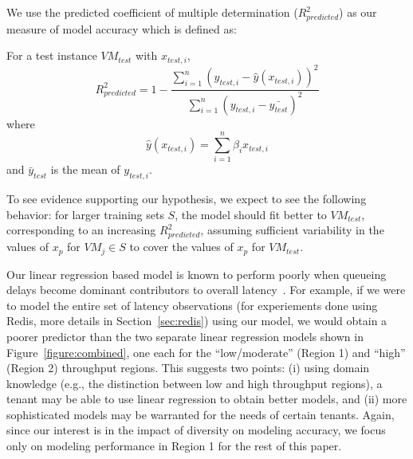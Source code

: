  We use the predicted coefficient of multiple determination ($R^2_{predicted}$) as our measure of model accuracy which is defined as: 
\begin{definition}
For a test instance $VM_{test}$ with $x_{test,i}$,
\begin{displaymath}
R_{predicted}^2=1-\frac{\sum_{i=1}^{n} (y_{test,i} - \hat{y}(x_{test,i}))^{2}}{\sum_{i=1}^{n} (y_{test,i} - \bar{y_{test}})^{2}}
\end{displaymath}
where
\begin{displaymath}
\hat{y}(x_{test,i})=\sum_{i=1}^{n} \beta_i x_{test,i}
\end{displaymath}
and $\bar{y}_{test}$ is the mean of $y_{test,i}$.
\end{definition}


To see evidence supporting our hypothesis, we expect to see the following behavior: for larger training sets $S$, the model should fit better to $VM_{test}$, corresponding to an increasing $R^2_{predicted}$, assuming sufficient variability in the values of $x_p$ for $VM_j\in S$ to cover the values of $x_p$ for $VM_{test}$.  

 Our linear regression based model is known to perform poorly when queueing delays become dominant contributors to overall latency~\cite{Stewart07}. 
For example, if we were to model the entire set of latency observations (for experiements done using Redis, more details
in Section~\ref{sec:redis}) using our model, we would obtain a poorer predictor than the two separate linear regression
models shown in Figure~\ref{figure:combined}, one each for the ``low/moderate'' (Region 1) and ``high'' (Region 2) throughput regions. This suggests two points: (i) using domain knowledge (e.g., the distinction between low and high throughput regions), a 
tenant may be able to use linear regression to obtain better models, and (ii) more sophisticated models may be 
warranted for the needs of certain tenants. Again, since our interest is in the impact of diversity on modeling accuracy,
we focus only on modeling performance in Region 1 for the rest of this paper. 


